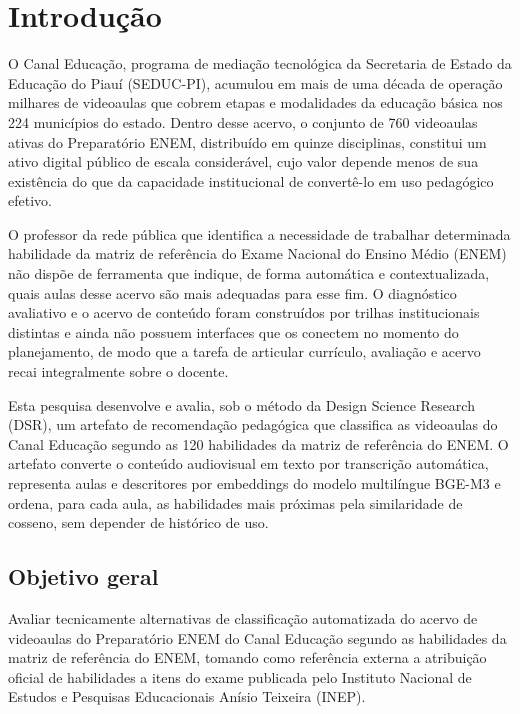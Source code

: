 
\section{Introdução}

O Canal Educação, programa de mediação tecnológica da Secretaria de Estado da
Educação do Piauí (SEDUC-PI), acumulou em mais de uma década de operação
milhares de videoaulas que cobrem etapas e modalidades da educação básica nos
224 municípios do estado. Dentro desse acervo, o conjunto de 760 videoaulas
ativas do Preparatório ENEM, distribuído em quinze disciplinas, constitui um
ativo digital público de escala considerável, cujo valor depende menos de sua
existência do que da capacidade institucional de convertê-lo em uso pedagógico
efetivo.

O professor da rede pública que identifica a necessidade de trabalhar
determinada habilidade da matriz de referência do Exame Nacional do Ensino
Médio (ENEM) não dispõe de ferramenta que indique, de forma automática e
contextualizada, quais aulas desse acervo são mais adequadas para esse fim. O
diagnóstico avaliativo e o acervo de conteúdo foram construídos por trilhas
institucionais distintas e ainda não possuem interfaces que os conectem no
momento do planejamento, de modo que a tarefa de articular currículo, avaliação
e acervo recai integralmente sobre o docente.

Esta pesquisa desenvolve e avalia, sob o método da Design Science Research
(DSR), um artefato de recomendação pedagógica que classifica as videoaulas do
Canal Educação segundo as 120 habilidades da matriz de referência do ENEM. O
artefato converte o conteúdo audiovisual em texto por transcrição automática,
representa aulas e descritores por embeddings do modelo multilíngue BGE-M3 e
ordena, para cada aula, as habilidades mais próximas pela similaridade de
cosseno, sem depender de histórico de uso.

\subsection{Objetivo geral}

Avaliar tecnicamente alternativas de classificação automatizada do acervo de
videoaulas do Preparatório ENEM do Canal Educação segundo as habilidades da
matriz de referência do ENEM, tomando como referência externa a atribuição
oficial de habilidades a itens do exame publicada pelo Instituto Nacional de
Estudos e Pesquisas Educacionais Anísio Teixeira (INEP).

